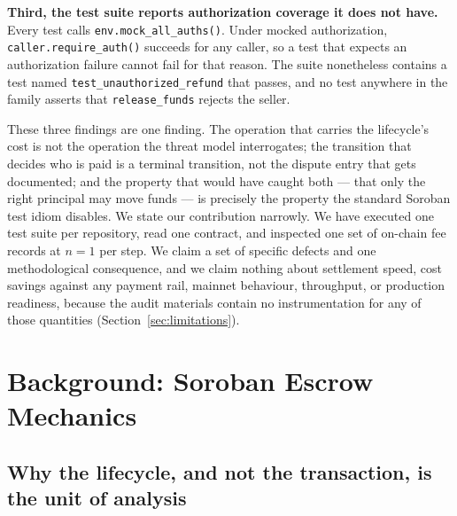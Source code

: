 \documentclass[sigconf,review]{acmart}
\begin{document}
\textbf{Third, the test suite reports authorization coverage it does not
have.} Every test calls \texttt{env.mock\_all\_auths()}. Under mocked
authorization, \texttt{caller.require\_auth()} succeeds for any caller, so a
test that expects an authorization failure cannot fail for that reason. The
suite nonetheless contains a test named \texttt{test\_unauthorized\_refund}
that passes, and no test anywhere in the family asserts that
\texttt{release\_funds} rejects the seller.

These three findings are one finding. The operation that carries the
lifecycle's cost is not the operation the threat model interrogates; the
transition that decides who is paid is a terminal transition, not the dispute
entry that gets documented; and the property that would have caught both --- that
only the right principal may move funds --- is precisely the property the
standard Soroban test idiom disables. We state our contribution narrowly. We
have executed one test suite per repository, read one contract, and inspected
one set of on-chain fee records at $n=1$ per step. We claim a set of specific
defects and one methodological consequence, and we claim nothing about
settlement speed, cost savings against any payment rail, mainnet behaviour,
throughput, or production readiness, because the audit materials contain no
instrumentation for any of those quantities
(Section~\ref{sec:limitations}).


\section{Background: Soroban Escrow Mechanics}
\label{sec:background}

\subsection{Why the lifecycle, and not the transaction, is the unit of analysis}
\end{document}
